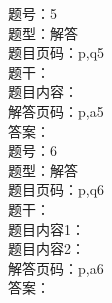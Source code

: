 \documentclass[11pt]{article}
\theoremstyle{definition}
\begin{document}
\begin{CJK*}{UTF8}{gbsn}
题号：5\\
题型：解答\\
题目页码：p,q5\\
题干：\\
题目内容：\\
解答页码：p,a5\\
答案：\\

题号：6\\
题型：解答\\
题目页码：p,q6\\
题干：\\
题目内容1：\\
题目内容2：\\
解答页码：p,a6\\
答案：\\
\\
\\
\\

\end{CJK*}
\end{document}
